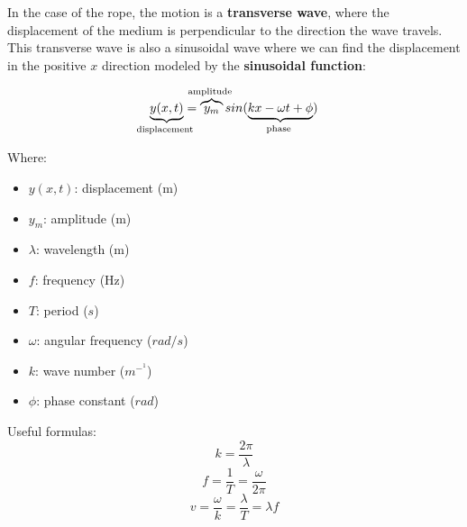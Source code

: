 \documentclass[11pt]{article}
\begin{document}
    \noindent In the case of the rope, the motion is a \textbf{transverse wave}, where the displacement of the medium is perpendicular to the direction the wave travels.
    This transverse wave is also a sinusoidal wave where we can find the displacement in the positive $x$ direction modeled by the \textbf{sinusoidal function}:


    \begin{equation}
       \underbrace{y(x,t)}_{\text{\clap{displacement~}}} = \overbrace{y_m}^{\text{\clap{amplitude~}}} sin(\underbrace{kx - \omega t + \phi}_{\text{\clap{phase~}}})\label{eq:equation}
    \end{equation}

    \newline


\hfill
\begin{minipage}[b]{0.5\textwidth}
    Where:
    \begin{itemize}
        \item $y(x,t)$: displacement (m)
        \item $y_m$: amplitude (m)
        \item $\lambda$: wavelength (m)
        \item $f$: frequency (Hz)
        \item $T$: period ($s$)
        \item $\omega$: angular frequency ($rad/s$)
        \item $k$: wave number ($m^-^1$)
        \item $\phi$: phase constant ($rad$)
        \end{itemize}
\end{minipage}
 \newline
\newline
    \noident Useful formulas:
\begin{equation}
    k = \frac{2\pi}{\lambda} \tag{angular wave number}
\end{equation}
\begin{equation}
    f = \frac{1}{T} = \frac{\omega}{2\pi} \tag{frequency}
\end{equation}
\begin{equation}
    v = \frac{\omega}{k} = \frac{\lambda}{T} = \lambda f \tag{wave velocity}
\end{equation}
\end{document}
